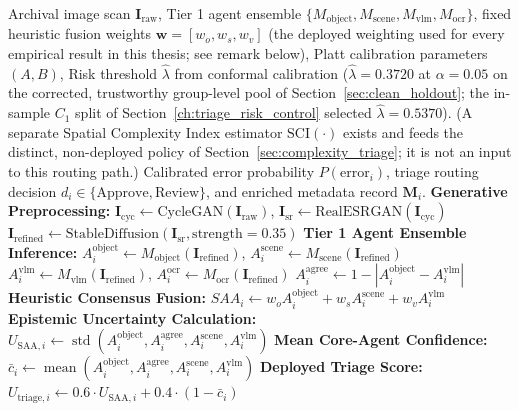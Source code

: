 \documentclass[12pt,a4paper]{report}
\begin{document}
\begin{algorithm}[!htbp]
\caption{DCV-MAC Multi-Agent Validation Core and Triage Routing}
\label{alg:dcv_mac_triage}
\begin{algorithmic}[1]
\Require Archival image scan $\mathbf{I}_{\text{raw}}$, Tier 1 agent ensemble $\{M_{\text{object}}, M_{\text{scene}}, M_{\text{vlm}}, M_{\text{ocr}}\}$, fixed heuristic fusion weights $\mathbf{w} = [w_o, w_s, w_v]$ (the deployed weighting used for every empirical result in this thesis; see remark below), Platt calibration parameters $(A, B)$, Risk threshold $\hat{\lambda}$ from conformal calibration ($\hat{\lambda}=0.3720$ at $\alpha=0.05$ on the corrected, trustworthy group-level pool of Section~\ref{sec:clean_holdout}; the in-sample $C_1$ split of Section~\ref{ch:triage_risk_control} selected $\hat{\lambda}=0.5370$). (A separate Spatial Complexity Index estimator $\text{SCI}(\cdot)$ exists and feeds the distinct, non-deployed policy of Section~\ref{sec:complexity_triage}; it is not an input to this routing path.)
\Ensure Calibrated error probability $P(\text{error}_i)$, triage routing decision $d_i \in \{\text{Approve}, \text{Review}\}$, and enriched metadata record $\mathbf{M}_i$.
\State \textbf{Generative Preprocessing:} $\mathbf{I}_{\text{cyc}} \leftarrow \text{CycleGAN}(\mathbf{I}_{\text{raw}})$, \quad $\mathbf{I}_{\text{sr}} \leftarrow \text{RealESRGAN}(\mathbf{I}_{\text{cyc}})$
\State \quad $\mathbf{I}_{\text{refined}} \leftarrow \text{StableDiffusion}(\mathbf{I}_{\text{sr}}, \text{strength}=0.35)$
\State \textbf{Tier 1 Agent Ensemble Inference:}
\State \quad $A_i^{\text{object}} \leftarrow M_{\text{object}}(\mathbf{I}_{\text{refined}})$, \quad $A_i^{\text{scene}} \leftarrow M_{\text{scene}}(\mathbf{I}_{\text{refined}})$
\State \quad $A_i^{\text{vlm}} \leftarrow M_{\text{vlm}}(\mathbf{I}_{\text{refined}})$, \quad $A_i^{\text{ocr}} \leftarrow M_{\text{ocr}}(\mathbf{I}_{\text{refined}})$
\State \quad $A_i^{\text{agree}} \leftarrow 1 - |A_i^{\text{object}} - A_i^{\text{vlm}}|$ 
\State \textbf{Heuristic Consensus Fusion:} $SAA_i \leftarrow w_o A_i^{\text{object}} + w_s A_i^{\text{scene}} + w_v A_i^{\text{vlm}}$
\State \textbf{Epistemic Uncertainty Calculation:} $U_{\text{SAA}, i} \leftarrow \operatorname{std}(A_i^{\text{object}}, A_i^{\text{agree}}, A_i^{\text{scene}}, A_i^{\text{vlm}})$
\State \textbf{Mean Core-Agent Confidence:} $\bar{c}_i \leftarrow \operatorname{mean}(A_i^{\text{object}}, A_i^{\text{agree}}, A_i^{\text{scene}}, A_i^{\text{vlm}})$
\State \textbf{Deployed Triage Score:} $U_{\text{triage}, i} \leftarrow 0.6 \cdot U_{\text{SAA}, i} + 0.4 \cdot (1 - \bar{c}_i)$ 

\end{algorithmic}
\end{algorithm}
\end{document}
